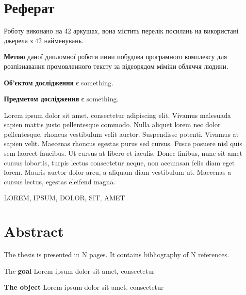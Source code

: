 \chapter*{Реферат}
\pagestyle{empty}
\thispagestyle{empty}

Роботу виконано на 42 аркушах, вона містить перелік посилань на використані джерела з $42$ найменувань.

\textbf{Метою} даної дипломної роботи ииии побудова програмного комплексу для розпізнавання промовленного тексту за відеорядом міміки обляччя людини.

\textbf{Об'єктом дослідження} є something.

\textbf{Предметом дослідження} є something.

Lorem ipsum dolor sit amet, consectetur adipiscing elit. Vivamus malesuada sapien mattis justo pellentesque commodo. 
Nulla aliquet lorem nec dolor pellentesque, rhoncus vestibulum velit auctor. Suspendisse potenti. Vivamus at sapien velit.
Maecenas rhoncus egestas purus sed cursus. Fusce posuere nisl quis sem laoreet faucibus. Ut cursus at libero et iaculis. 
Donec finibus, nunc sit amet cursus lobortis, turpis lectus consectetur neque, non accumsan felis diam eget lorem. Mauris 
auctor dolor arcu, a aliquam diam vestibulum ut. Maecenas a cursus lectus, egestas eleifend magna.
 
\MakeUppercase{Lorem, ipsum, dolor, sit, amet}

\chapter*{Abstract}
\thispagestyle{empty}
The thesis is presented in N pages. It contains bibliography of N references.


The \textbf{goal} Lorem ipsum dolor sit amet, consectetur

\textbf{The object} Lorem ipsum dolor sit amet, consectetur

